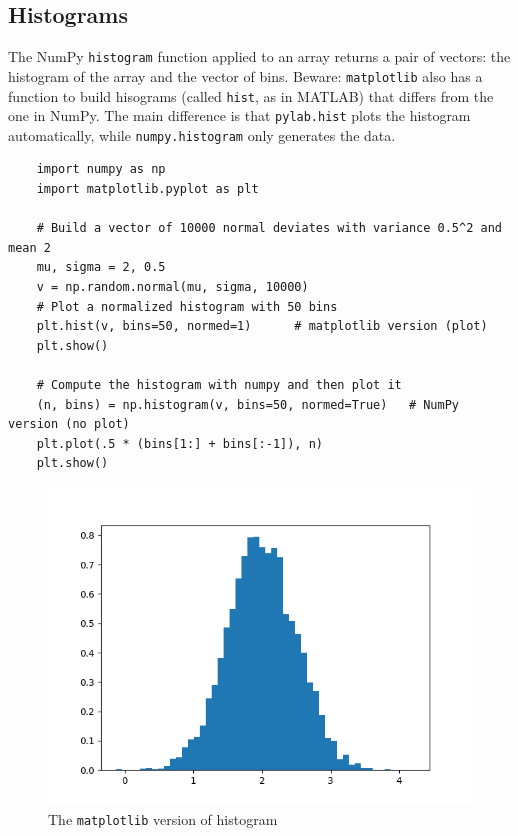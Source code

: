 \documentclass[UTF8]{article}
\begin{document}
\subsection{Histograms}
The NumPy \texttt{histogram} function applied to an array returns a pair of vectors: the histogram
of the array and the vector of bins. Beware: \texttt{matplotlib} also has a function to build
hisograms (called \texttt{hist}, as in MATLAB) that differs from the one in NumPy. The main
difference is that \texttt{pylab.hist} plots the histogram automatically, while
\texttt{numpy.histogram} only generates the data.
\begin{verbatim}
    import numpy as np
    import matplotlib.pyplot as plt

    # Build a vector of 10000 normal deviates with variance 0.5^2 and mean 2
    mu, sigma = 2, 0.5
    v = np.random.normal(mu, sigma, 10000)
    # Plot a normalized histogram with 50 bins
    plt.hist(v, bins=50, normed=1)      # matplotlib version (plot)
    plt.show()

    # Compute the histogram with numpy and then plot it
    (n, bins) = np.histogram(v, bins=50, normed=True)   # NumPy version (no plot)
    plt.plot(.5 * (bins[1:] + bins[:-1]), n)
    plt.show()
\end{verbatim}

\begin{figure}[ht]
    \centering
    \includegraphics[scale=0.6]{hist_matplotlib.png}
    \caption{The \texttt{matplotlib} version of histogram}
\end{figure}
\end{document}
